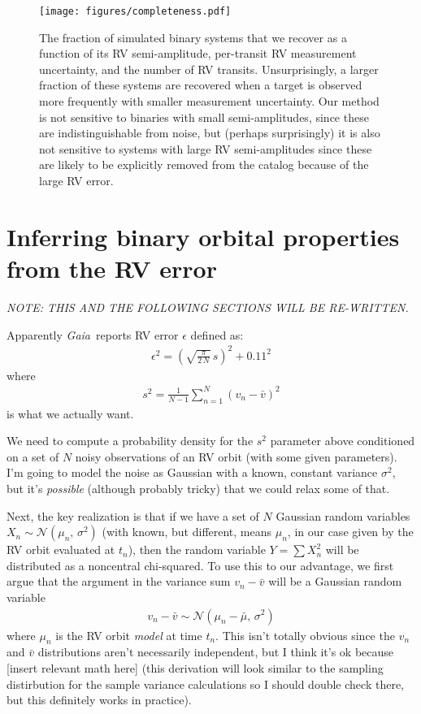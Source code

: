 \documentclass[modern, letterpaper]{aastex631}
\newcommand{\project}[1]{\textsl{#1}}
\newcommand{\Gaia}{\project{Gaia}}
\begin{document}
\begin{figure}
	\begin{centering}
		\texttt{[image: figures/completeness.pdf]}
		\caption{The fraction of simulated binary systems that we recover as a function of its RV semi-amplitude, per-transit RV measurement uncertainty, and the number of RV transits. Unsurprisingly, a larger fraction of these systems are recovered when a target is observed more frequently with smaller measurement uncertainty. Our method is not sensitive to binaries with small semi-amplitudes, since these are indistinguishable from noise, but (perhaps surprisingly) it is also not sensitive to systems with large RV semi-amplitudes since these are likely to be explicitly removed from the catalog because of the large RV error.}
		\label{fig:completeness}
	\end{centering}
\end{figure}


\newpage

\section{Inferring binary orbital properties from the RV error}

\noindent
\emph{NOTE: THIS AND THE FOLLOWING SECTIONS WILL BE RE-WRITTEN.}

Apparently \Gaia\ reports RV error $\epsilon$ defined as:
\begin{eqnarray}
	\epsilon^2 = \left(\sqrt{\frac{\pi}{2\,N}}\,s\right)^2 + 0.11^2
\end{eqnarray}
where
\begin{eqnarray}
	s^2 = \frac{1}{N-1}\sum_{n=1}^N \left(v_n - \bar{v}\right)^2
\end{eqnarray}
is what we actually want.

We need to compute a probability density for the $s^2$ parameter above conditioned on a set of $N$ noisy observations of an RV orbit (with some given parameters).
I'm going to model the noise as Gaussian with a known, constant variance $\sigma^2$, but it's \emph{possible} (although probably tricky) that we could relax some of that.

Next, the key realization is that if we have a set of $N$ Gaussian random variables $X_n \sim \mathcal{N}\left(\mu_n,\,\sigma^2\right)$ (with known, but different, means $\mu_n$, in our case given by the RV orbit evaluated at $t_n$), then the random variable $Y = \sum X_n^2$ will be distributed as a noncentral chi-squared.
To use this to our advantage, we first argue that the argument in the variance sum $v_n - \bar{v}$ will be a Gaussian random variable
\begin{eqnarray}
	v_n - \bar{v} \sim \mathcal{N}\left(\mu_n - \bar{\mu},\,\sigma^2\right)
\end{eqnarray}
where $\mu_n$ is the RV orbit \emph{model} at time $t_n$.
This isn't totally obvious since the $v_n$ and $\bar{v}$ distributions aren't necessarily independent, but I think it's ok because [insert relevant math here] (this derivation will look similar to the sampling distirbution for the sample variance calculations so I should double check there, but this definitely works in practice).
\end{document}
